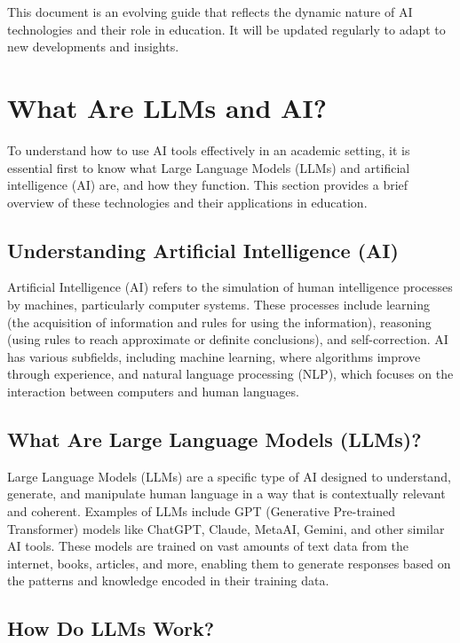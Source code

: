 \documentclass{article}
\begin{document}
This document is an evolving guide that reflects the dynamic nature of AI technologies and their role in education. It will be updated regularly to adapt to new developments and insights.


\section{What Are LLMs and AI?}

To understand how to use AI tools effectively in an academic setting, it is essential first to know what Large Language Models (LLMs) and artificial intelligence (AI) are, and how they function. This section provides a brief overview of these technologies and their applications in education.

\subsection{Understanding Artificial Intelligence (AI)}

Artificial Intelligence (AI) refers to the simulation of human intelligence processes by machines, particularly computer systems. These processes include learning (the acquisition of information and rules for using the information), reasoning (using rules to reach approximate or definite conclusions), and self-correction. AI has various subfields, including machine learning, where algorithms improve through experience, and natural language processing (NLP), which focuses on the interaction between computers and human languages.

\subsection{What Are Large Language Models (LLMs)?}

Large Language Models (LLMs) are a specific type of AI designed to understand, generate, and manipulate human language in a way that is contextually relevant and coherent. Examples of LLMs include GPT (Generative Pre-trained Transformer) models like ChatGPT, Claude, MetaAI, Gemini, and other similar AI tools. These models are trained on vast amounts of text data from the internet, books, articles, and more, enabling them to generate responses based on the patterns and knowledge encoded in their training data.

\subsection{How Do LLMs Work?}
\end{document}

